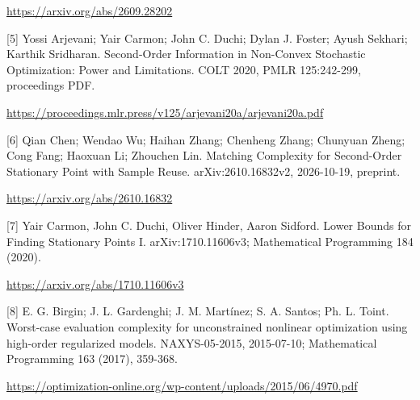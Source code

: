 \documentclass[10pt,a4paper]{article}
\begin{document}
\url{https://arxiv.org/abs/2609.28202}

[5] Yossi Arjevani; Yair Carmon; John C. Duchi; Dylan J. Foster; Ayush Sekhari; Karthik Sridharan. Second-Order Information in Non-Convex Stochastic Optimization: Power and Limitations. COLT 2020, PMLR 125:242-299, proceedings PDF.

\url{https://proceedings.mlr.press/v125/arjevani20a/arjevani20a.pdf}

[6] Qian Chen; Wendao Wu; Haihan Zhang; Chenheng Zhang; Chunyuan Zheng; Cong Fang; Haoxuan Li; Zhouchen Lin. Matching Complexity for Second-Order Stationary Point with Sample Reuse. arXiv:2610.16832v2, 2026-10-19, preprint.

\url{https://arxiv.org/abs/2610.16832}

[7] Yair Carmon, John C. Duchi, Oliver Hinder, Aaron Sidford. Lower Bounds for Finding Stationary Points I. arXiv:1710.11606v3; Mathematical Programming 184 (2020).

\url{https://arxiv.org/abs/1710.11606v3}

[8] E. G. Birgin; J. L. Gardenghi; J. M. Martínez; S. A. Santos; Ph. L. Toint. Worst-case evaluation complexity for unconstrained nonlinear optimization using high-order regularized models. NAXYS-05-2015, 2015-07-10; Mathematical Programming 163 (2017), 359-368.

\url{https://optimization-online.org/wp-content/uploads/2015/06/4970.pdf}
\end{document}
